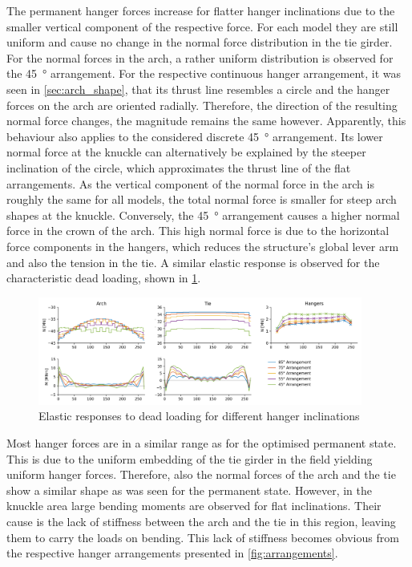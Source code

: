 The permanent hanger forces increase for flatter hanger inclinations due to the smaller vertical component of the respective force. For each model they are still uniform and cause no change in the normal force distribution in the tie girder. For the normal forces in the arch, a rather uniform distribution is observed for the \SI{45}{\degree} arrangement. For the respective continuous hanger arrangement, it was seen in \cref{sec:arch_shape}, that its thrust line resembles a circle and the hanger forces on the arch are oriented radially. Therefore, the direction of the resulting normal force changes, the magnitude remains the same however. Apparently, this behaviour also applies to the considered discrete \SI{45}{\degree} arrangement. Its lower normal force at the knuckle can alternatively be explained by the steeper inclination of the circle, which approximates the thrust line of the flat arrangements. As the vertical component of the normal force in the arch is roughly the same for all models, the total normal force is smaller for steep arch shapes at the knuckle. Conversely, the \SI{45}{\degree} arrangement causes a higher normal force in the crown of the arch. This high normal force is due to the horizontal force components in the hangers, which reduces the structure's global lever arm and also the tension in the tie. 
A similar elastic response is observed for the characteristic dead loading, shown in \cref{fig:inclination_dead}.
\begin{figure}[H]
    \centering
    \includegraphics[width=0.95\textwidth]{calculations/parallel arrangement comparison/dead load_plot.png}
    \caption{Elastic responses to dead loading for different hanger inclinations}
    \label{fig:inclination_dead}
\end{figure}

Most hanger forces are in a similar range as for the optimised permanent state. This is due to the uniform embedding of the tie girder in the field yielding uniform hanger forces. Therefore, also the normal forces of the arch and the tie show a similar shape as was seen for the permanent state. However, in the knuckle area large bending moments are observed for flat inclinations. Their cause is the lack of stiffness between the arch and the tie in this region, leaving them to carry the loads on bending. This lack of stiffness becomes obvious from the respective hanger arrangements presented in \cref{fig:arrangements}.

